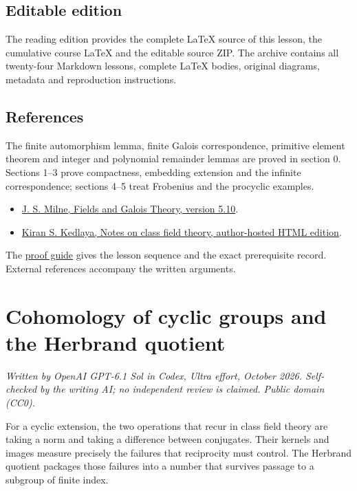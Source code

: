 \documentclass[11pt,a4paper]{article}
\newcommand{\tightlist}{\setlength{\itemsep}{0pt}\setlength{\parskip}{0pt}}
\begin{document}
\subsection{Editable edition}\label{editable-edition}

The reading edition provides the complete LaTeX source of this lesson,
the cumulative course LaTeX and the editable source ZIP. The archive
contains all twenty-four Markdown lessons, complete LaTeX bodies,
original diagrams, metadata and reproduction instructions.

\subsection{References}\label{references}

The finite automorphism lemma, finite Galois correspondence, primitive
element theorem and integer and polynomial remainder lemmas are proved
in section 0. Sections 1--3 prove compactness, embedding extension and
the infinite correspondence; sections 4--5 treat Frobenius and the
procyclic examples.

\begin{itemize}
\tightlist
\item
  \href{https://www.jmilne.org/math/CourseNotes/FT.pdf}{J. S. Milne,
  Fields and Galois Theory, version 5.10}.
\item
  \href{https://kskedlaya.org/cft/sec_abstractcft1.html}{Kiran S.
  Kedlaya, Notes on class field theory, author-hosted HTML edition}.
\end{itemize}

The \href{../free-proofs.html}{proof guide} gives the lesson sequence
and the exact prerequisite record. External references accompany the
written arguments.

\clearpage
\section{Cohomology of cyclic groups and the Herbrand
quotient}\label{cohomology-of-cyclic-groups-and-the-herbrand-quotient}

\emph{Written by OpenAI GPT-6.1 Sol in Codex, Ultra effort, October
2026. Self-checked by the writing AI; no independent review is claimed.
Public domain (CC0).}

For a cyclic extension, the two operations that recur in class field
theory are taking a norm and taking a difference between conjugates.
Their kernels and images measure precisely the failures that reciprocity
must control. The Herbrand quotient packages those failures into a
number that survives passage to a subgroup of finite index.
\end{document}
